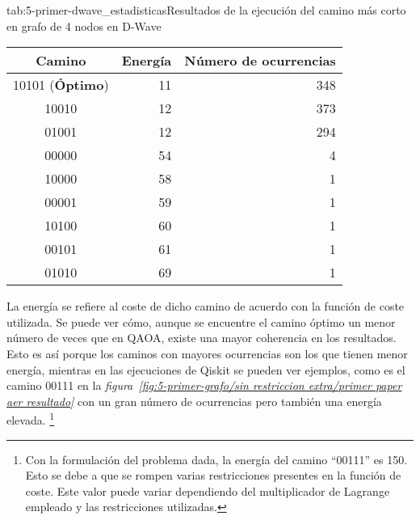 \begin{table}[htbp]{tab:5-primer-dwave_estadisticas}{Resultados de la ejecución del camino más corto en grafo de 4 nodos en D-Wave}
  \centering
  \begin{tabular}{|c|r|r|}
    \hline
    \textbf{Camino}         & \textbf{Energía} & \textbf{Número de ocurrencias} \\ \hline
    10101 (\textbf{Óptimo}) & 11               & 348                            \\ \hline
    10010                   & 12               & 373                            \\ \hline
    01001                   & 12               & 294                            \\ \hline
    00000                   & 54               &   4                            \\ \hline
    10000                   & 58               &   1                            \\ \hline
    00001                   & 59               &   1                            \\ \hline
    10100                   & 60               &   1                            \\ \hline
    00101                   & 61               &   1                            \\ \hline
    01010                   & 69               &   1                            \\ \hline
  \end{tabular}
\end{table}

La energía se refiere al coste de dicho camino de acuerdo con la función de coste utilizada. Se puede ver cómo, aunque se encuentre el camino óptimo un menor número de veces que en QAOA, existe una mayor coherencia en los resultados. Esto es así porque los caminos con mayores ocurrencias son los que tienen menor energía, mientras en las ejecuciones de Qiskit se pueden ver ejemplos, como es el camino 00111 en la \textit{figura~\ref{fig:5-primer-grafo/sin restriccion extra/primer paper aer resultado}} con un gran número de ocurrencias pero también una energía elevada.
\footnote{Con la formulación del problema dada, la energía del camino ``00111'' es 150. Esto se debe a que se rompen varias restricciones presentes en la función de coste. Este valor puede variar dependiendo del multiplicador de Lagrange empleado
  y las restricciones utilizadas.}


